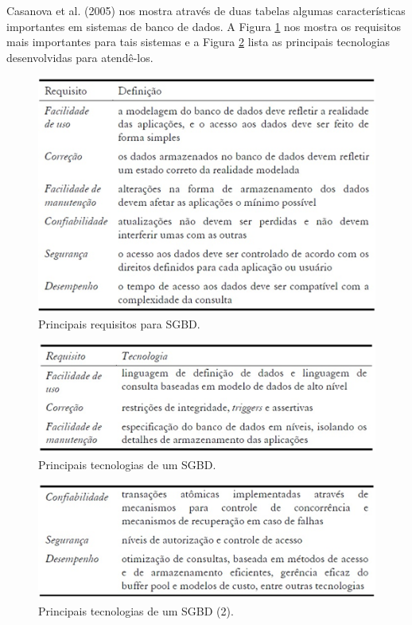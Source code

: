 		Casanova et al. (2005)\cite{CASANOVA_etal05} nos mostra através de duas tabelas algumas características importantes em sistemas de banco de dados. A Figura \ref{fig:requisitossgbd} nos mostra os requisitos mais importantes para tais sistemas e a Figura \ref{fig:princtecsgbd1} lista as principais tecnologias desenvolvidas para atendê-los.
		
		\begin{figure}
			\centering
			\includegraphics[width=1\linewidth]{data/requisitos_SGBD}
			\caption{Principais requisitos para SGBD. \cite{CASANOVA_etal05}}
			\label{fig:requisitossgbd}
		\end{figure}
		
		
		\begin{figure}
			\centering
			\includegraphics[width=1\linewidth]{data/princ_tec_SGBD_1}
			\caption{Principais tecnologias de um SGBD. \cite{CASANOVA_etal05}}
			\label{fig:princtecsgbd1}
		\end{figure}
		
		\begin{figure}
			\centering
			\includegraphics[width=1\linewidth]{data/princ_tec_SGBD_2}
			\caption{Principais tecnologias de um SGBD (2). \cite{CASANOVA_etal05}}
			\label{fig:princtecsgbd2}
		\end{figure}
		
